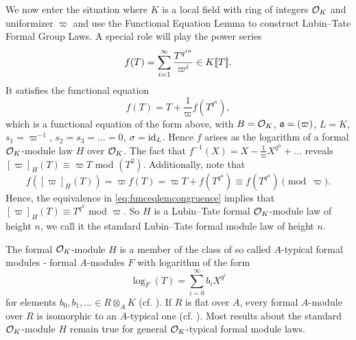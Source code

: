 \documentclass[../main.tex]{subfiles}
\begin{document}
We now enter the situation where $K$ is a local field with ring of integers
$\mathcal{O}_K$ and uniformizer $\varpi$ and 
use the Functional Equation Lemma to construct Lubin--Tate Formal Group Laws. 
A special role will play the power series
\begin{equation*}
  f(T) = \sum_{i=1}^\infty \frac{T^{q^{in}}}{\varpi^i} \in K\llbracket T \rrbracket.
\end{equation*}
It satisfies the functional equation
\begin{equation*}
  f(T) = T + \frac 1\varpi f(T^{q^n}),
\end{equation*}
which is a functional equation of the form above, with 
$B = \mathcal{O}_K$, $\mathfrak{a} = (\varpi)$, $L = K$, $s_1 = \varpi^{-1}$, $s_2 = s_3 = \dots = 0$,
$\sigma = \operatorname{id}_L$. 
Hence $f$ arises as the logarithm of a formal $\mathcal{O}_K$-module law $H$ over $\mathcal{O}_K$.
The fact that $f^{-1}(X) = X - \frac 1\varpi X^{q^n} + \dots$ reveals
$[\varpi]_H(T) \equiv \varpi T$ mod $(T^2)$. Additionally, note that 
\begin{equation*}
  f([\varpi]_H(T)) = \varpi f(T) = \varpi T + f(T^{q^n}) \equiv f(T^{q^n}) \pmod \varpi.
\end{equation*}
Hence, the equivalence in \eqref{eq:funceqlemcongruence} implies that 
$[\varpi]_H(T) \equiv T^{q^n}$ mod $\varpi$. So $H$ is a Lubin--Tate formal $\mathcal{O}_K$-module
law of height $n$, we call it the standard Lubin--Tate formal module law of
height $n$. 
\begin{rmk} 
  The formal $\mathcal{O}_K$-module $H$ is a member of the class of so called $A$-typical
  formal modules - formal $A$-modules $F$ with logarithm of the 
  form
  \begin{equation*}
    \log_F(T) = \sum_{i=0}^\infty b_i X^{q^i}
  \end{equation*}
  for elements $b_0, b_1, \dots \in R \otimes_A K$ (cf. \cite[Definition
  21.5.5 and Criterion 21.5.9]{hazewinkel1978formal}). If $R$ is flat over $A$,
  every formal $A$-module over $R$ is isomorphic to an $A$-typical one
  (cf. \cite[21.5.6]{hazewinkel1978formal}). Most results about the standard
  $\mathcal{O}_K$-module $H$ remain true for general $\mathcal{O}_K$-typical formal module laws.
\end{rmk}
\end{document}

